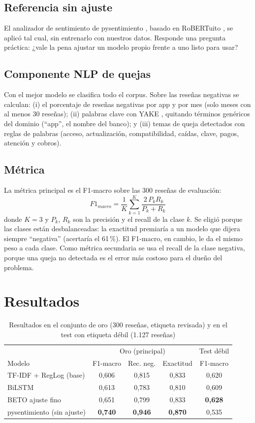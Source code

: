 \documentclass[conference]{IEEEtran}
\begin{document}
\subsection{Referencia sin ajuste}
El analizador de sentimiento de pysentimiento \cite{perez2021pysentimiento}, basado en RoBERTuito
\cite{perez2022robertuito}, se aplicó tal cual, sin entrenarlo con nuestros datos. Responde una pregunta práctica:
¿vale la pena ajustar un modelo propio frente a uno listo para usar?

\subsection{Componente NLP de quejas}
Con el mejor modelo se clasifica todo el corpus. Sobre las reseñas negativas se calculan: (i) el porcentaje de
reseñas negativas por app y por mes (solo meses con al menos 30 reseñas); (ii) palabras clave con YAKE
\cite{campos2020yake}, quitando términos genéricos del dominio (``app'', el nombre del banco); y (iii) temas de queja
detectados con reglas de palabras (acceso, actualización, compatibilidad, caídas, clave, pagos, atención y cobros).

\subsection{Métrica}
La métrica principal es el F1-macro sobre las 300 reseñas de evaluación:
\begin{equation}
F1_{macro} = \frac{1}{K}\sum_{k=1}^{K} \frac{2\,P_k R_k}{P_k + R_k}
\end{equation}
donde $K=3$ y $P_k$, $R_k$ son la precisión y el recall de la clase $k$. Se eligió porque las clases están
desbalanceadas: la exactitud premiaría a un modelo que dijera siempre ``negativa'' (acertaría el 61\,\%). El F1-macro,
en cambio, le da el mismo peso a cada clase. Como métrica secundaria se usa el recall de la clase negativa, porque
una queja no detectada es el error más costoso para el dueño del problema.

\section{Resultados}
\begin{table}[t]
\caption{Resultados en el conjunto de oro (300 reseñas, etiqueta revisada) y en el test con etiqueta débil (1.127 reseñas)}
\label{tab:resultados}
\centering
\setlength{\tabcolsep}{4pt}
\begin{tabular}{lcccc}
\toprule
 & \multicolumn{3}{c}{Oro (principal)} & Test débil \\
Modelo & F1-macro & Rec. neg. & Exactitud & F1-macro \\
\midrule
TF-IDF + RegLog (base) & 0,606 & 0,815 & 0,833 & 0,620 \\
BiLSTM & 0,613 & 0,783 & 0,810 & 0,609 \\
BETO ajuste fino & 0,651 & 0,799 & 0,833 & \textbf{0,628} \\
pysentimiento (sin ajuste) & \textbf{0,740} & \textbf{0,946} & \textbf{0,870} & 0,535 \\
\bottomrule
\end{tabular}
\end{table}
\end{document}
